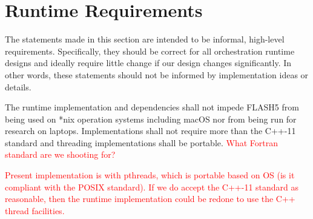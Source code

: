 \documentclass{article}
\begin{document}
%
%
%
%

\section{Runtime Requirements}
The statements made in this section are intended to be informal, high-level
requirements.  Specifically, they should be correct for all orchestration
runtime designs and ideally require little change if our design changes
significantly.  In other words, these statements should not be informed by
implementation ideas or details.

\begin{req}
The runtime implementation and dependencies shall not impede FLASH5 from being
used on *nix operation systems including macOS nor from being run for research
on laptops.  Implementations shall not require more than the C++-11 standard and
threading implementations shall be portable.  \textcolor{red}{What Fortran
standard are we shooting for?}
\end{req}

\textcolor{red}{Present implementation is with pthreads, which is portable based
on OS (is it compliant with the POSIX standard).  If we do accept the C++-11
standard as reasonable, then the runtime implementation could be redone to use
the C++ thread facilities.}\\
\end{document}
